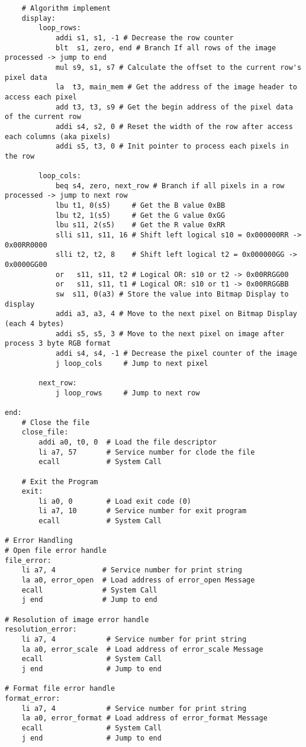 \documentclass{article}
\begin{document}
\begin{verbatim}
    # Algorithm implement
    display:    
        loop_rows:
            addi s1, s1, -1 # Decrease the row counter               
            blt  s1, zero, end # Branch If all rows of the image processed -> jump to end      
            mul s9, s1, s7 # Calculate the offset to the current row's pixel data     
            la  t3, main_mem # Get the address of the image header to access each pixel    
            add t3, t3, s9 # Get the begin address of the pixel data of the current row      
            addi s4, s2, 0 # Reset the width of the row after access each columns (aka pixels)                     
            addi s5, t3, 0 # Init pointer to process each pixels in the row           
        
        loop_cols:
            beq s4, zero, next_row # Branch if all pixels in a row processed -> jump to next row            
            lbu t1, 0(s5)     # Get the B value 0xBB     
            lbu t2, 1(s5)     # Get the G value 0xGG   
            lbu s11, 2(s5)    # Get the R value 0xRR  
            slli s11, s11, 16 # Shift left logical s10 = 0x000000RR -> 0x00RR0000
            slli t2, t2, 8    # Shift left logical t2 = 0x000000GG -> 0x0000GG00
            or   s11, s11, t2 # Logical OR: s10 or t2 -> 0x00RRGG00
            or   s11, s11, t1 # Logical OR: s10 or t1 -> 0x00RRGGBB
            sw  s11, 0(a3) # Store the value into Bitmap Display to display
            addi a3, a3, 4 # Move to the next pixel on Bitmap Display (each 4 bytes)
            addi s5, s5, 3 # Move to the next pixel on image after process 3 byte RGB format 
            addi s4, s4, -1 # Decrease the pixel counter of the image 
            j loop_cols     # Jump to next pixel
        
        next_row:
            j loop_rows     # Jump to next row

end:
    # Close the file
    close_file:
        addi a0, t0, 0  # Load the file descriptor
        li a7, 57       # Service number for clode the file
        ecall           # System Call
        
    # Exit the Program
    exit:
        li a0, 0        # Load exit code (0)
        li a7, 10       # Service number for exit program
        ecall           # System Call

# Error Handling
# Open file error handle
file_error:
    li a7, 4           # Service number for print string
    la a0, error_open  # Load address of error_open Message
    ecall              # System Call
    j end              # Jump to end

# Resolution of image error handle
resolution_error:
    li a7, 4            # Service number for print string
    la a0, error_scale  # Load address of error_scale Message 
    ecall               # System Call
    j end               # Jump to end

# Format file error handle
format_error:
    li a7, 4            # Service number for print string
    la a0, error_format # Load address of error_format Message
    ecall               # System Call
    j end               # Jump to end

\end{verbatim}
\end{document}
